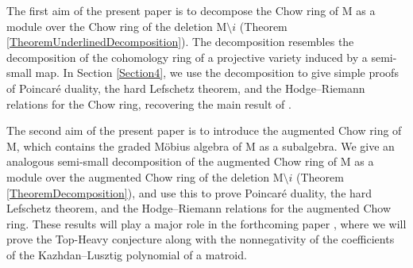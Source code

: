 \documentclass[11pt,reqno]{amsart}
\theoremstyle{definition}
\theoremstyle{remark}
\renewcommand{\(}{\left(}
\renewcommand{\)}{\right)}
\newcommand{\<}{\left<}
\renewcommand{\>}{\right>}
\begin{document}

The first aim of the present paper is to decompose the Chow ring of $\mathrm{M}$ as a module over the Chow ring of the deletion $\mathrm{M} \setminus i$ (Theorem \ref{TheoremUnderlinedDecomposition}).
The decomposition resembles the decomposition of the cohomology ring of a projective variety induced by a semi-small map.
In Section \ref{Section4}, we use the decomposition to give simple proofs of Poincar\'e duality, the hard Lefschetz theorem, and the Hodge--Riemann relations  for the Chow ring, recovering the main result of \cite{AHK}.  


The second aim of the present paper is to introduce the augmented Chow ring of $\mathrm{M}$, which contains the graded M\"{o}bius algebra of $\mathrm{M}$ as a subalgebra.  We give an analogous semi-small decomposition of the augmented Chow ring of $\mathrm{M}$ as a module over the augmented Chow ring of the deletion $\mathrm{M} \setminus i$ (Theorem \ref{TheoremDecomposition}), and use this
to prove Poincar\'e duality, the hard Lefschetz theorem, and the Hodge--Riemann relations for the augmented Chow ring.  
These results will play a major role in the forthcoming paper \cite{BHMPW}, where we will prove the Top-Heavy conjecture along with the nonnegativity of the coefficients of the Kazhdan--Lusztig polynomial of a matroid.
\end{document}
